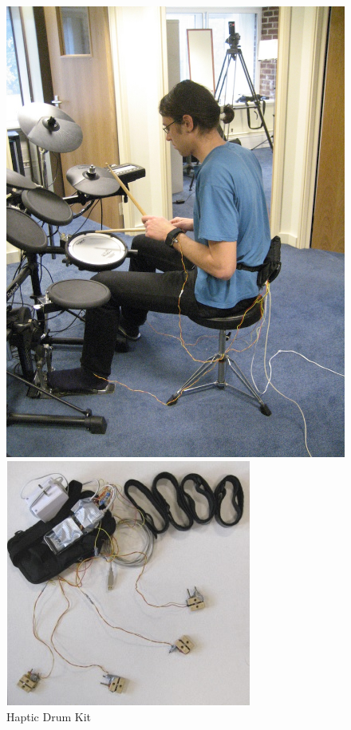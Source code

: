 \documentclass[ngerman,runningheads,a4paper]{llncs}
\begin{document}
\begin{figure}[H]
  \centering
  \begin{minipage}[b]{0.4\textwidth}
    \includegraphics[width = \textwidth]{pictures/hapticdrumkit}
    \caption{Haptic Drum Kit \cite{10.1145/1709886.1709892}}
    \label{hapkit1}
  \end{minipage}
  \hspace{0.1\textwidth}
  \begin{minipage}[b]{0.4\textwidth}
    \includegraphics[width = \textwidth]{pictures/hapticdrumkit1}

\end{minipage}
\end{figure}
\end{document}
